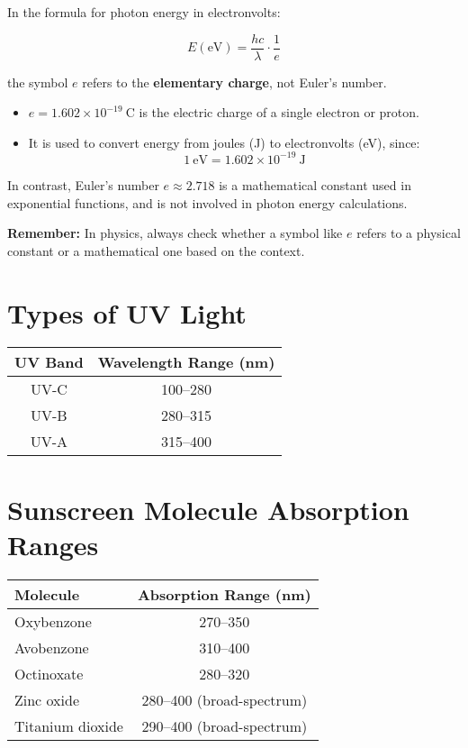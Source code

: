 \documentclass[12pt]{article}
\begin{document}
In the formula for photon energy in electronvolts:

\[
E(\text{eV}) = \frac{hc}{\lambda} \cdot \frac{1}{e}
\]

the symbol \( e \) refers to the \textbf{elementary charge}, not Euler’s number.

\begin{itemize}
    \item \( e = 1.602 \times 10^{-19}\ \text{C} \) is the electric charge of a single electron or proton.
    \item It is used to convert energy from joules (J) to electronvolts (eV), since:
    \[
    1\ \text{eV} = 1.602 \times 10^{-19}\ \text{J}
    \]
\end{itemize}

\noindent
In contrast, Euler’s number \( e \approx 2.718 \) is a mathematical constant used in exponential functions, and is not involved in photon energy calculations.

\vspace{0.5em}
\noindent
\textbf{Remember:} In physics, always check whether a symbol like \( e \) refers to a physical constant or a mathematical one based on the context.

\section*{Types of UV Light}

\begin{center}
\begin{tabular}{|c|c|}
\hline
\textbf{UV Band} & \textbf{Wavelength Range (nm)} \\
\hline
UV-C & 100–280 \\
UV-B & 280–315 \\
UV-A & 315–400 \\
\hline
\end{tabular}
\end{center}

\section*{Sunscreen Molecule Absorption Ranges}

\begin{center}
\begin{tabular}{|l|c|}
\hline
\textbf{Molecule} & \textbf{Absorption Range (nm)} \\
\hline
Oxybenzone & 270–350 \\
Avobenzone & 310–400 \\
Octinoxate & 280–320 \\
Zinc oxide & 280–400 (broad-spectrum) \\
Titanium dioxide & 290–400 (broad-spectrum) \\
\hline
\end{tabular}
\end{center}
\end{document}
